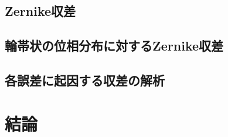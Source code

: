 \subsection{Zernike収差}

\subsection{輪帯状の位相分布に対するZernike収差}


\subsection{各誤差に起因する収差の解析}



\section{結論}
\label{chap2_conclusion}



